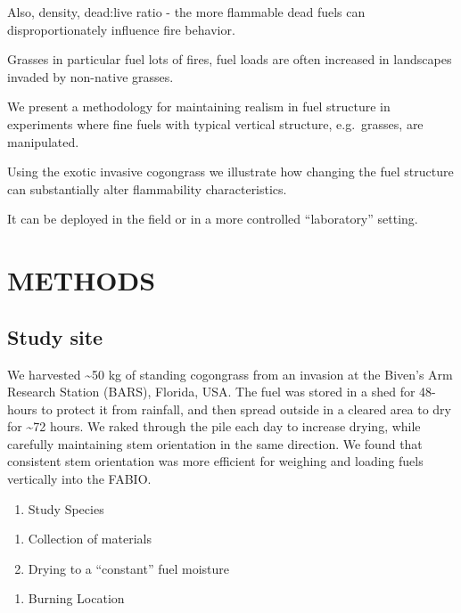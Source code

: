 \documentclass[11pt,a4paper]{article}
\begin{document}
Also, density, dead:live ratio - the more flammable dead fuels can
disproportionately influence fire behavior.

Grasses in particular fuel lots of fires, fuel loads are often increased
in landscapes invaded by non-native grasses.

We present a methodology for maintaining realism in fuel structure in
experiments where fine fuels with typical vertical structure,
e.g.~grasses, are manipulated.

Using the exotic invasive cogongrass we illustrate how changing the fuel
structure can substantially alter flammability characteristics.

It can be deployed in the field or in a more controlled ``laboratory''
setting.

\hypertarget{methods}{%
\section{METHODS}\label{methods}}

\hypertarget{study-site}{%
\subsection{Study site}\label{study-site}}

We harvested \textasciitilde{}50 kg of standing cogongrass from an
invasion at the Biven's Arm Research Station (BARS), Florida, USA. The
fuel was stored in a shed for 48-hours to protect it from rainfall, and
then spread outside in a cleared area to dry for \textasciitilde{}72
hours. We raked through the pile each day to increase drying, while
carefully maintaining stem orientation in the same direction. We found
that consistent stem orientation was more efficient for weighing and
loading fuels vertically into the FABIO.

\begin{enumerate}
\def\labelenumi{\arabic{enumi}.}
\tightlist
\item
  Study Species
\end{enumerate}

\begin{enumerate}
\def\labelenumi{\alph{enumi}.}
\tightlist
\item
  Collection of materials
\item
  Drying to a ``constant'' fuel moisture
\end{enumerate}

\begin{enumerate}
\def\labelenumi{\arabic{enumi}.}
\setcounter{enumi}{1}
\tightlist
\item
  Burning Location\\
\end{enumerate}
\end{document}
